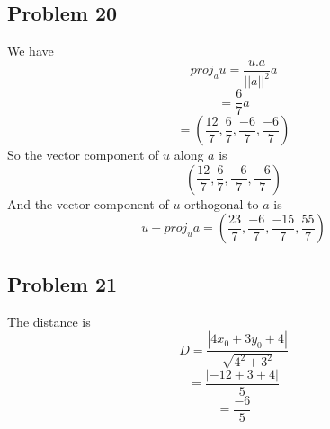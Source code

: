 \documentclass[a4paper,12pt]{report}
\begin{document}
\subsection*{Problem 20}
We have 
\[proj_au=\frac{u.a}{||a||^2}a\]
\[=\frac{6}{7}a\]
\[=(\frac{12}{7},\frac{6}{7},\frac{-6}{7},\frac{-6}{7})\]
So the vector component of \(u\) along \(a\) is 
\[(\frac{12}{7},\frac{6}{7},\frac{-6}{7},\frac{-6}{7})\]
And the vector component of \(u\) orthogonal to \(a\) is
\[u-proj_ua=(\frac{23}{7},\frac{-6}{7},\frac{-15}{7},\frac{55}{7})\]

\subsection*{Problem 21}
The distance is
\[D= \frac{|4x_0+3y_0+4|}{\sqrt{4^2+3^2}}\]
\[=\frac{|-12+3+4|}{5}\]
\[=\frac{-6}{5}\]

\begin{thebibliography}{9}

\end{thebibliography}
\end{document}
